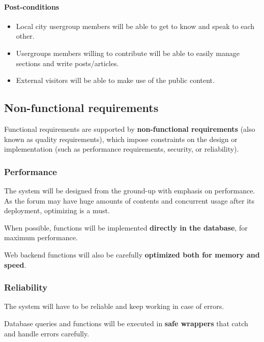 \documentclass[12pt]{report}
\renewcommand\emph{\textbf}
\begin{document}
                        \paragraph{Post-conditions}
                            \begin{itemize}
                                \item Local city usergroup members will be able to get to know and speak to each other.
                                \item Usergroups members willing to contribute will be able to easily manage sections and write posts/articles.
                                \item External visitors will be able to make use of the public content.
                            \end{itemize}

                \subsection{Non-functional requirements}   
                    Functional requirements are supported by \emph{non-functional requirements} (also known as quality requirements), which impose constraints on the design or implementation (such as performance requirements, security, or reliability). 

                    \subsubsection{Performance}
                        The system will be designed from the ground-up with emphasis on performance. As the forum may have huge amounts of contents and concurrent usage after its deployment, optimizing is a must.

                        When possible, functions will be implemented \emph{directly in the database}, for maximum performance.

                        Web backend functions will also be carefully \emph{optimized both for memory and speed}.

                    \subsubsection{Reliability}
                        The system will have to be reliable and keep working in case of errors. 

                        Database queries and functions will be executed in \emph{safe wrappers} that catch and handle errors carefully.
\end{document}
